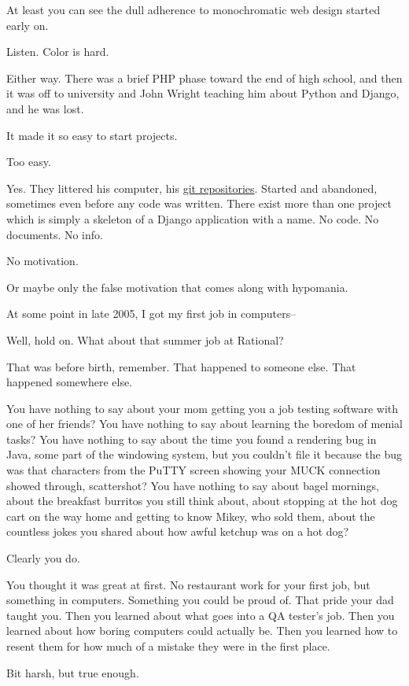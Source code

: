 \begin{paracol}{2}
\begin{leftcolumn}
\begin{ally}
At least you can see the dull adherence to monochromatic web design started early on.
\end{ally}
Listen. Color is hard.

Either way. There was a brief PHP phase toward the end of high school, and then it was off to university and John Wright teaching him about Python and Django, and he was lost.

It made it so easy to start projects.

\begin{ally}
Too easy.
\end{ally}
Yes. They littered his computer, his \href{https://github.com/makyo-old/}{git repositories}. Started and abandoned, sometimes even before any code was written. There exist more than one project which is simply a skeleton of a Django application with a name. No code. No documents. No info.

\begin{ally}
No motivation.
\end{ally}
Or maybe only the false motivation that comes along with hypomania.
\newpage

\noindent At some point in late 2005, I got my first job in computers--

\begin{ally}
Well, hold on. What about that summer job at Rational?
\end{ally}
That was before birth, remember. That happened to someone else. That happened somewhere else.

\begin{ally}
You have nothing to say about your mom getting you a job testing software with one of her friends? You have nothing to say about learning the boredom of menial tasks? You have nothing to say about the time you found a rendering bug in Java, some part of the windowing system, but you couldn't file it because the bug was that characters from the PuTTY screen showing your MUCK connection showed through, scattershot? You have nothing to say about bagel mornings, about the breakfast burritos you still think about, about stopping at the hot dog cart on the way home and getting to know Mikey, who sold them, about the countless jokes you shared about how awful ketchup was on a hot dog?
\end{ally}
Clearly you do.

\begin{ally}
You thought it was great at first. No restaurant work for your first job, but something in computers. Something you could be proud of. That pride your dad taught you. Then you learned about what goes into a QA tester's job. Then you learned about how boring computers could actually be. Then you learned how to resent them for how much of a mistake they were in the first place.
\end{ally}
Bit harsh, but true enough.


\end{leftcolumn}
\end{paracol}

